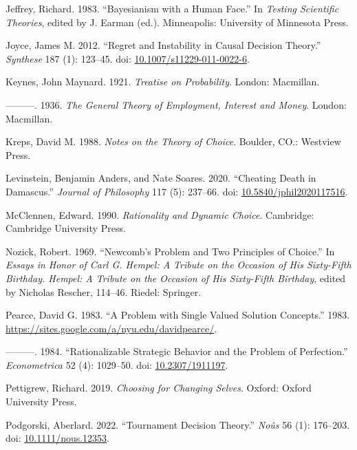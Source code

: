 \documentclass[
  11pt,
  letterpaper,
  DIV=11,
  numbers=noendperiod,
  twoside]{scrartcl}
\newlength{\cslhangindent}
\newenvironment{CSLReferences}[2] %
 {\begin{list}{}{%
  \setlength{\itemindent}{0pt}
  \setlength{\leftmargin}{0pt}
  \setlength{\parsep}{0pt}
  \ifodd #1
   \setlength{\leftmargin}{\cslhangindent}
   \setlength{\itemindent}{-1\cslhangindent}
  \fi
  \setlength{\itemsep}{#2\baselineskip}}}
 {\end{list}}
\begin{document}
\begin{CSLReferences}{1}{0}
Jeffrey, Richard. 1983. {``Bayesianism with a Human Face.''} In
\emph{Testing Scientific Theories}, edited by J. Earman (ed.).
Minneapolis: University of Minnesota Press.

Joyce, James M. 2012. {``Regret and Instability in Causal Decision
Theory.''} \emph{Synthese} 187 (1): 123--45. doi:
\href{https://doi.org/10.1007/s11229-011-0022-6}{10.1007/s11229-011-0022-6}.

Keynes, John Maynard. 1921. \emph{Treatise on Probability}. London:
Macmillan.

---------. 1936. \emph{The General Theory of Employment, Interest and
Money}. London: Macmillan.

Kreps, David M. 1988. \emph{Notes on the Theory of Choice}. Boulder,
CO.: Westview Press.

Levinstein, Benjamin Anders, and Nate Soares. 2020. {``Cheating Death in
Damascus.''} \emph{Journal of Philosophy} 117 (5): 237--66. doi:
\href{https://doi.org/10.5840/jphil2020117516}{10.5840/jphil2020117516}.

McClennen, Edward. 1990. \emph{Rationality and Dynamic Choice}.
Cambridge: {C}ambridge {U}niversity {P}ress.

Nozick, Robert. 1969. {``Newcomb's Problem and Two Principles of
Choice.''} In \emph{Essays in Honor of Carl {G}. Hempel: A Tribute on
the Occasion of His Sixty-Fifth Birthday. Hempel: A Tribute on the
Occasion of His Sixty-Fifth Birthday}, edited by Nicholas Rescher,
114--46. Riedel: Springer.

Pearce, David G. 1983. {``A Problem with Single Valued Solution
Concepts.''} 1983.
\url{https://sites.google.com/a/nyu.edu/davidpearce/}.

---------. 1984. {``Rationalizable Strategic Behavior and the Problem of
Perfection.''} \emph{Econometrica} 52 (4): 1029--50. doi:
\href{https://doi.org/10.2307/1911197}{10.2307/1911197}.

Pettigrew, Richard. 2019. \emph{Choosing for Changing Selves}. Oxford:
{O}xford {U}niversity {P}ress.

Podgorski, Aberlard. 2022. {``Tournament Decision Theory.''}
\emph{No{û}s} 56 (1): 176--203. doi:
\href{https://doi.org/10.1111/nous.12353}{10.1111/nous.12353}.


\end{CSLReferences}
\end{document}
